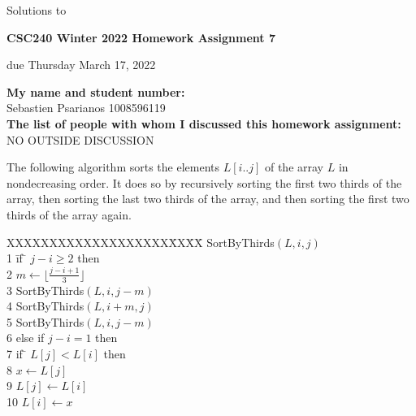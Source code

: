 \documentclass[11pt]{article}
\begin{document}
\begin{center}
\begin{solution}
Solutions to\\
\end{solution}

{\bf \Large \bf CSC240 Winter 2022 Homework Assignment 7}\\

\begin{questiononly}
due Thursday March 17, 2022
\end{questiononly}

\end{center}
{\bf My name and student number:}\\
Sebastien Psarianos 1008596119\\
{\bf The list of people with whom I discussed this homework assignment:}\\
NO OUTSIDE DISCUSSION\\

\begin{question}
The following  algorithm sorts the elements $L[i..j]$ of the array $L$ in nondecreasing order.
It does so by recursively sorting the first two thirds of the array,
then sorting the last two thirds of the array, and then sorting
the first two thirds of the array again.

 \begin{tabbing}
XXXXXXXXXXXXXXXXXXX\=XX\=XX\=\+\kill
    SortByThirds$(L,i,j)$ \\
    1 \hspace{2mm} \= if \= $j-i \geq 2$ then \\
    2 \> \> $m \leftarrow \lfloor \frac{j-i+1}{3} \rfloor$  \\
    3 \> \> SortByThirds$(L,i, j - m)$\\
    4 \> \> SortByThirds$(L,i + m , j)$\\
    5 \> \> SortByThirds$(L,i, j - m)$\\
    6 \> else if $j-i=1$ then  \\
    7 \> \> if \= $L[j] < L[i]$ then  \\
    8 \> \> \> $x \leftarrow L[j]$ \\
    9 \> \> \> $L[j] \leftarrow L[i]$ \\
    10 \> \> \> $L[i] \leftarrow x$
  \end{tabbing}
\end{question}
\end{document}

